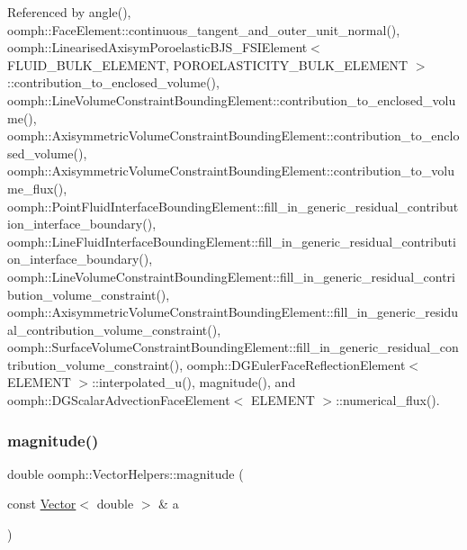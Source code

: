 Referenced by angle(), oomph\+::\+Face\+Element\+::continuous\+\_\+tangent\+\_\+and\+\_\+outer\+\_\+unit\+\_\+normal(), oomph\+::\+Linearised\+Axisym\+Poroelastic\+B\+J\+S\+\_\+\+F\+S\+I\+Element$<$ F\+L\+U\+I\+D\+\_\+\+B\+U\+L\+K\+\_\+\+E\+L\+E\+M\+E\+N\+T, P\+O\+R\+O\+E\+L\+A\+S\+T\+I\+C\+I\+T\+Y\+\_\+\+B\+U\+L\+K\+\_\+\+E\+L\+E\+M\+E\+N\+T $>$\+::contribution\+\_\+to\+\_\+enclosed\+\_\+volume(), oomph\+::\+Line\+Volume\+Constraint\+Bounding\+Element\+::contribution\+\_\+to\+\_\+enclosed\+\_\+volume(), oomph\+::\+Axisymmetric\+Volume\+Constraint\+Bounding\+Element\+::contribution\+\_\+to\+\_\+enclosed\+\_\+volume(), oomph\+::\+Axisymmetric\+Volume\+Constraint\+Bounding\+Element\+::contribution\+\_\+to\+\_\+volume\+\_\+flux(), oomph\+::\+Point\+Fluid\+Interface\+Bounding\+Element\+::fill\+\_\+in\+\_\+generic\+\_\+residual\+\_\+contribution\+\_\+interface\+\_\+boundary(), oomph\+::\+Line\+Fluid\+Interface\+Bounding\+Element\+::fill\+\_\+in\+\_\+generic\+\_\+residual\+\_\+contribution\+\_\+interface\+\_\+boundary(), oomph\+::\+Line\+Volume\+Constraint\+Bounding\+Element\+::fill\+\_\+in\+\_\+generic\+\_\+residual\+\_\+contribution\+\_\+volume\+\_\+constraint(), oomph\+::\+Axisymmetric\+Volume\+Constraint\+Bounding\+Element\+::fill\+\_\+in\+\_\+generic\+\_\+residual\+\_\+contribution\+\_\+volume\+\_\+constraint(), oomph\+::\+Surface\+Volume\+Constraint\+Bounding\+Element\+::fill\+\_\+in\+\_\+generic\+\_\+residual\+\_\+contribution\+\_\+volume\+\_\+constraint(), oomph\+::\+D\+G\+Euler\+Face\+Reflection\+Element$<$ E\+L\+E\+M\+E\+N\+T $>$\+::interpolated\+\_\+u(), magnitude(), and oomph\+::\+D\+G\+Scalar\+Advection\+Face\+Element$<$ E\+L\+E\+M\+E\+N\+T $>$\+::numerical\+\_\+flux().

\mbox{\label{namespaceoomph_1_1VectorHelpers_af92401cf726dc1712b7fb861b8416e69}} 
\subsubsection{\texorpdfstring{magnitude()}{magnitude()}}
{\footnotesize\ttfamily double oomph\+::\+Vector\+Helpers\+::magnitude (\begin{DoxyParamCaption}\item[{const \hyperlink{classoomph_1_1Vector}{Vector}$<$ double $>$ \&}]{a }\end{DoxyParamCaption})\hspace{0.3cm}{\ttfamily [inline]}}



